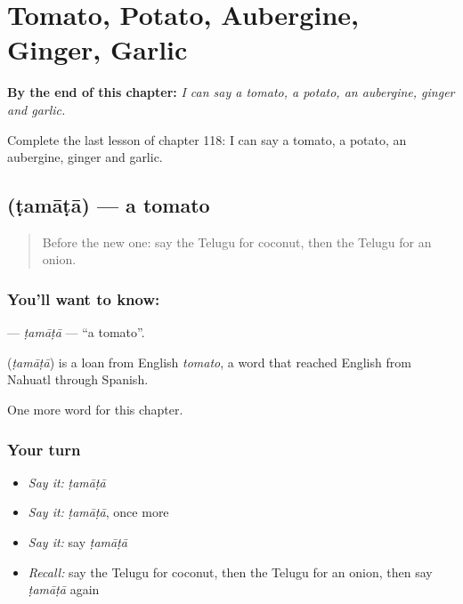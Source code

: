 
\chapter{Tomato, Potato, Aubergine, Ginger, Garlic}
\label{ch:te-tomato-potato-aubergine-ginger-garlic}

\begin{chapteropening}
\textbf{By the end of this chapter:} \emph{I can say a tomato, a potato, an aubergine, ginger and garlic.}

Complete the last lesson of chapter 118: I can say a tomato, a potato, an aubergine, ginger and garlic.
\end{chapteropening}

\section[\texorpdfstring{\te{టమాటా} (ṭamāṭā)}{టమాటా (ṭamāṭā)}]{ (ṭamāṭā) — a tomato}

\label{lesson:TE-C118-tamata}



\begin{quote}
Before the new one: say the Telugu for coconut, then the Telugu for an onion.
\end{quote}

\subsection*{You'll want to know: }
\textbf{} — \emph{ṭamāṭā} — \textquotedblleft{}a tomato\textquotedblright{}.

\begin{cousinweb}
\textbf{} (\emph{ṭamāṭā}) is a loan from English \emph{tomato}, a word that reached English from Nahuatl through Spanish.
\end{cousinweb}

\begin{grammarlens}[title={What you've built}]
One more word for this chapter.
\end{grammarlens}

\subsection*{Your turn}
\begin{itemize}
\raggedright
  \item \emph{Say it:} \emph{ṭamāṭā}
  \item \emph{Say it:} \emph{ṭamāṭā}, once more
  \item \emph{Say it:} say \emph{ṭamāṭā}
  \item \emph{Recall:} say the Telugu for coconut, then the Telugu for an onion, then say \emph{ṭamāṭā} again
\end{itemize}

